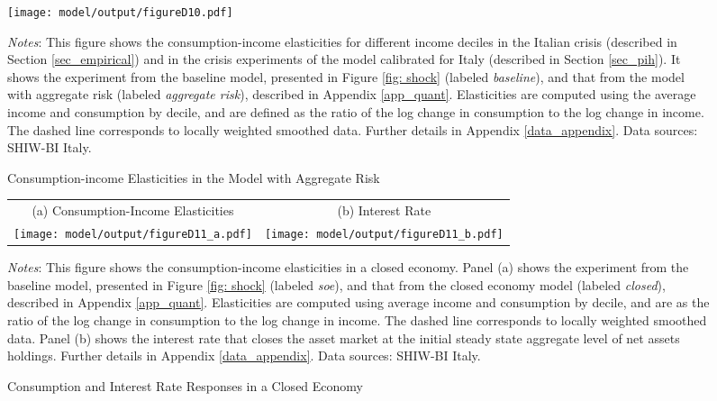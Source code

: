 \documentclass[12pt]{article}
\begin{document}
\begin{spacing}{1.5}
\begin{figure}[H]
\caption{Consumption-income Elasticities in the Model with Aggregate Risk}
\label{fig:agg_risk}
\texttt{[image: model/output/figureD10.pdf]} \\
\raggedright{}\textit{\footnotesize{}Notes}{: \footnotesize{
This figure shows the consumption-income elasticities for different income deciles in the Italian crisis (described in Section \ref{sec_empirical}) and in the crisis experiments of the model calibrated for Italy (described in Section \ref{sec_pih}).  It shows the experiment from the baseline model, presented in Figure \ref{fig: shock} (labeled \textit{baseline}), and that from the model with aggregate risk (labeled \textit{aggregate risk}), described in Appendix \ref{app_quant}.  Elasticities are computed using the average income and consumption by decile, and are defined as the ratio of the log change in consumption to the log change in income. The dashed line corresponds to locally weighted smoothed data. Further details in Appendix \ref{data_appendix}. Data sources: SHIW-BI Italy.
}}{\footnotesize\par}
\end{figure}


\begin{figure}[H]
\caption{Consumption and Interest Rate Responses in a Closed Economy}
\label{fig: closed_econ}
\begin{tabular}{cc}
(a) Consumption-Income Elasticities & (b) Interest Rate \\
\texttt{[image: model/output/figureD11\_a.pdf]} &
\texttt{[image: model/output/figureD11\_b.pdf]} \\
\end{tabular}
\raggedright{}\textit{\footnotesize{}Notes}{: \footnotesize{This figure shows the consumption-income elasticities in a closed economy.  Panel (a) shows the experiment from the baseline model, presented in Figure \ref{fig: shock} (labeled \textit{soe}), and that from the closed economy model (labeled \textit{closed}), described in Appendix \ref{app_quant}. Elasticities are computed using average income and consumption by decile, and are as the ratio of the log change in consumption to the log change in income. The dashed line corresponds to locally weighted smoothed data.  Panel (b) shows the interest rate that closes the asset market at the initial steady state aggregate level of net assets holdings. Further details in Appendix \ref{data_appendix}.
Data sources: SHIW-BI Italy.}}{\footnotesize\par}
\end{figure}


\end{spacing}
\end{document}
